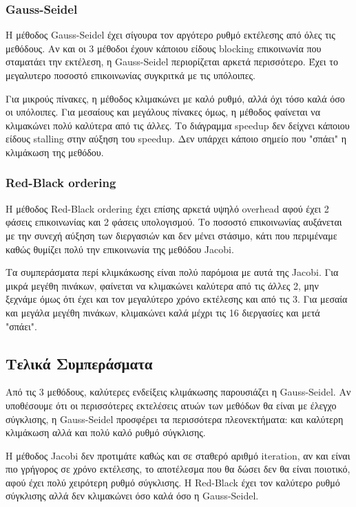 \documentclass[../final_report.tex]{subfiles}
\begin{document}
\subsubsection*{Gauss-Seidel}
Η μέθοδος Gauss-Seidel έχει σίγουρα τον αργότερο ρυθμό εκτέλεσης από όλες τις μεθόδους. Αν και οι 3 μέθοδοι έχουν κάποιου είδους blocking
επικοινωνία που σταματάει την εκτέλεση, η Gauss-Seidel περιορίζεται αρκετά περισσότερο. Έχει το μεγαλυτερο ποσοστό επικοινωνίας συγκριτκά με τις
υπόλοιπες. 

Για μικρούς πίνακες, η μέθοδος κλιμακώνει με καλό ρυθμό, αλλά όχι τόσο καλά όσο οι υπόλοιπες. Για μεσαίους και μεγάλους πίνακες όμως, η 
μέθοδος φαίνεται να κλιμακώνει πολύ καλύτερα από τις άλλες. Το διάγραμμα speedup δεν δείχνει κάποιου είδους stalling στην αύξηση του speedup. Δεν υπάρχει
κάποιο σημείο που "σπάει" η κλιμάκωση της μεθόδου.

\subsubsection*{Red-Black ordering}
Η μέθοδος Red-Black ordering έχει επίσης αρκετά υψηλό overhead αφού έχει 2 φάσεις επικοινωνίας και 2 φάσεις υπολογισμού.
Το ποσοστό επικοινωνίας αυξάνεται με την συνεχή αύξηση των διεργασιών και δεν μένει στάσιμο, κάτι που περιμέναμε καθώς 
θυμίζει πολύ την επικοινωνία της μεθόδου Jacobi.

Τα συμπεράσματα περί κλιμκάκωσης είναι πολύ παρόμοια με αυτά της Jacobi. Για μικρά μεγέθη πινάκων, φαίνεται να κλιμακώνει καλύτερα
από τις άλλες 2, μην ξεχνάμε όμως ότι έχει και τον μεγαλύτερο χρόνο εκτέλεσης και από τις 3. Για μεσαία και μεγάλα μεγέθη πινάκων, κλιμακώνει
καλά μέχρι τις 16 διεργασίες και μετά "σπάει".

\subsection{Τελικά Συμπεράσματα}

Από τις 3 μεθόδους, καλύτερες ενδείξεις κλιμάκωσης παρουσιάζει η Gauss-Seidel. Αν υποθέσουμε ότι οι περισσότερες εκτελέσεις ατυών των μεθόδων
θα είναι με έλεγχο σύγκλισης, η Gauss-Seidel προσφέρει τα περισσότερα πλεονεκτήματα: και καλύτερη κλιμάκωση αλλά και πολύ καλό ρυθμό σύγκλισης.

Η μέθοδος Jacobi δεν προτιμάτε καθώς και σε σταθερό αριθμό iteration, αν και είναι πιο γρήγορος σε χρόνο εκτέλεσης, το αποτέλεσμα που θα δώσει δεν
θα είναι ποιοτικό, αφού έχει πολύ χειρότερη ρυθμό σύγκλισης. Η Red-Black έχει τον καλύτερο ρυθμό σύγκλισης αλλά δεν κλιμακώνει όσο καλά όσο η Gauss-Seidel.
\end{document}
